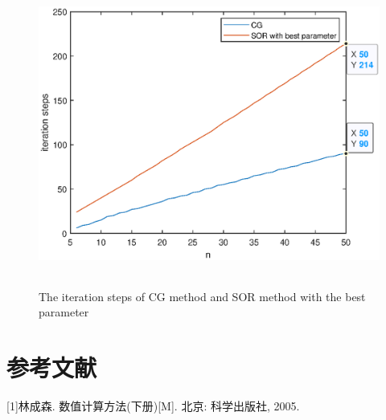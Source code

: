 \documentclass[UTF8,a4paper,10pt]{ctexart}
\begin{document}
\begin{figure}[ht]
    \centering
    \includegraphics[width=14cm,height=10cm]{2.6_steps.eps}
    \caption{The iteration steps of CG method and SOR method with the best parameter}
\end{figure}

    
\section*{参考文献}
[1]林成森. 数值计算方法(下册)[M]. 北京: 科学出版社, 2005.
\end{document}
